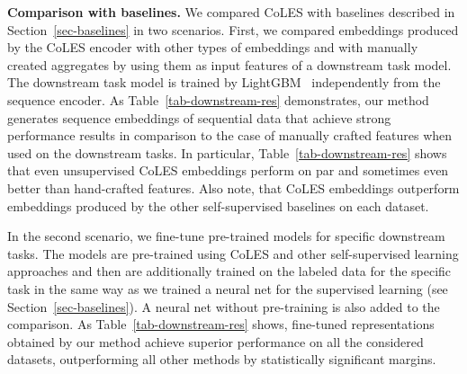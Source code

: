 \documentclass{article}
\begin{document}
\textbf{Comparison with baselines.} We compared CoLES with baselines described in Section~\ref{sec-baselines} in two scenarios. First, we compared embeddings produced by the CoLES encoder with other types of embeddings and with manually created aggregates by using them as input features of a downstream task model. The downstream task model is trained by LightGBM~\citep{Ke2017LightGBMAH}  independently from the sequence encoder. As Table~\ref{tab-downstream-res} demonstrates, our method generates sequence embeddings of sequential data that achieve strong performance results in comparison to the case of manually crafted features when used on the downstream tasks.
In particular, Table~\ref{tab-downstream-res} shows that even unsupervised CoLES embeddings perform on par and sometimes even better than hand-crafted features. Also note, that CoLES embeddings outperform embeddings produced by the other self-supervised baselines on each dataset.

In the second scenario, we fine-tune pre-trained models for specific downstream tasks. The models are pre-trained using CoLES and other self-supervised learning approaches and then are additionally trained on the labeled data for the specific task in the same way as we trained a neural net for the supervised learning (see Section~\ref{sec-baselines}). A neural net without pre-training is also added to the comparison. As Table~\ref{tab-downstream-res} shows, fine-tuned representations obtained by our method achieve superior performance on all the considered datasets, outperforming all other methods by statistically significant margins.
\end{document}
